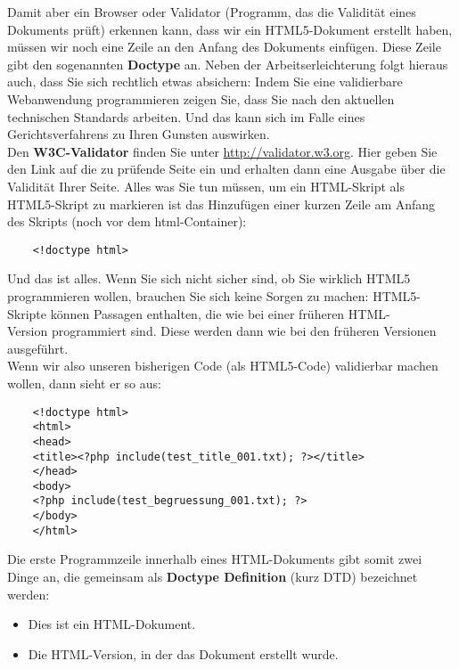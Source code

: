 Damit aber ein Browser oder Validator (Programm, das die Validität eines Dokuments prüft) erkennen kann, dass wir ein HTML5-Dokument erstellt haben, müssen wir noch eine Zeile an den Anfang des Dokuments einfügen. Diese Zeile gibt den sogenannten \textbf{Doctype} an. Neben der Arbeitserleichterung folgt hieraus auch, dass Sie sich rechtlich etwas absichern: Indem Sie eine validierbare Webanwendung programmieren zeigen Sie, dass Sie nach den aktuellen technischen Standards arbeiten. Und das kann sich im Falle eines Gerichtsverfahrens zu Ihren Gunsten auswirken.\\

Den \textbf{W3C-Validator} finden Sie unter \url{http://validator.w3.org}. Hier geben Sie den Link auf die zu prüfende Seite ein und erhalten dann eine Ausgabe über die Validität Ihrer Seite. Alles was Sie tun müssen, um ein HTML-Skript als HTML5-Skript zu markieren ist das Hinzufügen einer kurzen Zeile am Anfang des Skripts (noch vor dem html-Container):\\

\begin{verbatim}
	<!doctype html>
\end{verbatim}

Und das ist alles. Wenn Sie sich nicht sicher sind, ob Sie wirklich HTML5 programmieren wollen, brauchen Sie sich keine Sorgen zu machen: HTML5-Skripte können Passagen enthalten, die wie bei einer früheren HTML-\\Version programmiert sind. Diese werden dann wie bei den früheren Versionen ausgeführt.\\

Wenn wir also unseren bisherigen Code (als HTML5-Code) validierbar machen wollen, dann sieht er so aus:

\begin{verbatim}
	<!doctype html>
	<html>
	<head>
	<title><?php include(test_title_001.txt); ?></title>
	</head>
	<body>
	<?php include(test_begruessung_001.txt); ?>
	</body>
	</html>
\end{verbatim}

Die erste Programmzeile innerhalb eines HTML-Dokuments gibt somit zwei Dinge an, die gemeinsam als \textbf{Doctype Definition} (kurz DTD) bezeichnet werden:

\begin{itemize}
	\item Dies ist ein HTML-Dokument.
	\item Die HTML-Version, in der das Dokument erstellt wurde.
\end{itemize}

